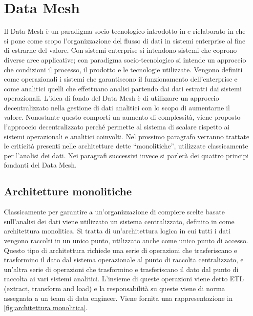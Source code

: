 \documentclass[12pt]{report}
\begin{document}
\section{Data Mesh}
Il Data Mesh è un paradigma socio-tecnologico introdotto in \cite{dehghani_data_2022} e rielaborato in \cite{zhamak_dehgani_how_2023,zhamak_dehgani_data_2023} che si pone come scopo l'organizzazione del flusso di dati in sistemi enterprise al fine di estrarne del valore.  
Con sistemi enterprise si intendono sistemi che coprono diverse aree applicative; con paradigma socio-tecnologico si intende un approccio che condizioni il processo, il prodotto e le tecnologie utilizzate. 
Vengono definiti come operazionali i sistemi che garantiscono il funzionamento dell'enterprise e come analitici quelli che effettuano analisi partendo dai dati estratti dai sistemi operazionali.
L'idea di fondo del Data Mesh è di utilizzare un approccio decentralizzato nella gestione di dati analitici con lo scopo di aumentarne il valore.
Nonostante questo comporti un aumento di complessità, viene proposto l'approccio decentralizzato perché permette al sistema di scalare rispetto ai sistemi operazionali e analitici coinvolti. 
Nel prossimo paragrafo verranno trattate le criticità presenti nelle architetture dette ``monolitiche'', utilizzate classicamente per l'analisi dei dati. 
Nei paragrafi successivi invece si parlerà dei quattro principi fondanti del Data Mesh.
\subsection{Architetture monolitiche}\label{architetture monolitiche}
Classicamente per garantire a un'organizzazione di compiere scelte basate sull'analisi dei dati viene utilizzato un sistema centralizzato, definito in \cite{zhamak_dehgani_how_2023} come architettura monolitica.
Si tratta di un'architettura logica in cui tutti i dati vengono raccolti in un unico punto, utilizzato anche come unico punto di accesso.
Questo tipo di architettura richiede una serie di operazioni che trasferiscano e trasformino il dato dal sistema operazionale al punto di raccolta centralizzato, e un'altra serie di operazioni che trasformino e trasferiscano il dato dal punto di raccolta ai vari sistemi analitici. 
L'insieme di queste operazioni viene detto ETL (extract, transform and load) e la responsabilità su queste viene di norma assegnata a un team di data engineer. 
Viene fornita una rappresentazione in \ref{fig:architettura monolitica}.
\end{document}
